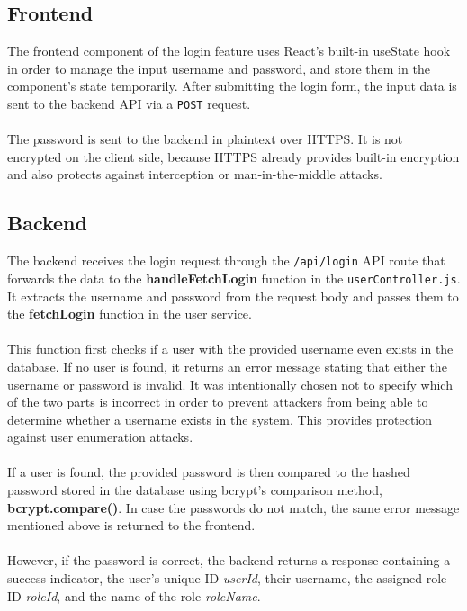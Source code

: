 \documentclass[a4paper,12pt]{report}
\begin{document}
\subsection{Frontend}
The frontend component of the login feature uses React's built-in useState hook in order to manage the input username and password, and store them in the component's state temporarily. After submitting the login form, the input data is sent to the backend API via a \texttt{POST} request. \\\\
The password is sent to the backend in plaintext over HTTPS. It is not encrypted on the client side, because HTTPS already provides built-in encryption and also protects against interception or man-in-the-middle attacks. \\
\subsection{Backend}
The backend receives the login request through the \texttt{/api/login} API route that forwards the data to the \textbf{handleFetchLogin} function in the \texttt{userController.js}. It extracts the username and password from the request body and passes them to the \textbf{fetchLogin} function in the user service. \\\\
This function first checks if a user with the provided username even exists in the database. If no user is found, it returns an error message stating that either the username or password is invalid. It was intentionally chosen not to specify which of the two parts is incorrect in order to prevent attackers from being able to determine whether a username exists in the system. This provides protection against user enumeration attacks. \\\\
If a user is found, the provided password is then compared to the hashed password stored in the database using bcrypt's comparison method, \textbf{bcrypt.compare()}. In case the passwords do not match, the same error message mentioned above is returned to the frontend. \\\\
However, if the password is correct, the backend returns a response containing a success indicator, the user's unique ID \textit{userId}, their username, the assigned role ID \textit{roleId}, and the name of the role \textit{roleName}. \\
\end{document}

